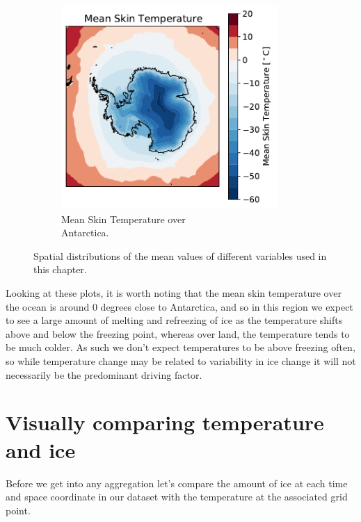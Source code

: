 \documentclass[../main.tex]{subfiles}
\begin{document}
\begin{figure}[h!]
\begin{subfigure}[h!]{0.49\textwidth}
\end{subfigure}
\begin{subfigure}[h!]{0.49\textwidth}
\includegraphics[width=0.9\textwidth]{images/week8/hres/mean_skt_distribution}
\caption{Mean Skin Temperature over \\ Antarctica.}
\end{subfigure}
\caption{Spatial distributions of the mean values of different variables used in this chapter.}
\label{fig:mean_distributions}
\end{figure}

Looking at these plots, it is worth noting that the mean skin temperature over the ocean is around 0 degrees close to Antarctica, and so in this region we expect to see a large amount of melting and refreezing of ice as the temperature shifts above and below the freezing point, whereas over land, the temperature tends to be much colder. As such we don't expect temperatures to be above freezing often, so while temperature change may be related to variability in ice change it will not necessarily be the predominant driving factor. 


\section{Visually comparing temperature and ice}
Before we get into any aggregation let's compare the amount of ice at each time and space coordinate in our dataset with the temperature at the associated grid point. 
\end{document}
